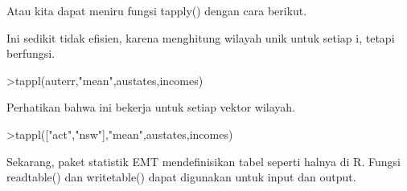 \documentclass[a4paper,10pt]{article}
\begin{document}
\begin{eulernotebook}
\begin{eulercomment}
\begin{eulercomment}
\begin{eulercomment}
\begin{eulercomment}
\begin{eulercomment}
\begin{eulercomment}
\begin{eulercomment}
\begin{eulercomment}
\begin{eulercomment}
\begin{eulercomment}
\begin{eulercomment}
\begin{eulercomment}
\begin{eulercomment}
\begin{eulercomment}
\begin{eulercomment}
\begin{eulercomment}
\begin{eulercomment}
\begin{eulercomment}
\begin{eulercomment}
\begin{eulercomment}
\begin{eulercomment}
\begin{eulercomment}
\begin{eulercomment}
Atau kita dapat meniru fungsi tapply() dengan cara berikut.
\end{eulercomment}
\begin{eulercomment}
Ini sedikit tidak efisien, karena menghitung wilayah unik untuk setiap
i, tetapi berfungsi.
\end{eulercomment}
\begin{eulerprompt}
>tappl(auterr,"mean",austates,incomes)
\end{eulerprompt}
\begin{euleroutput}
  [44.5,  57.3333333333,  55.5,  53.6,  55,  60.5,  56,  52.25]
\end{euleroutput}
\begin{eulercomment}
Perhatikan bahwa ini bekerja untuk setiap vektor wilayah.
\end{eulercomment}
\begin{eulerprompt}
>tappl(["act","nsw"],"mean",austates,incomes)
\end{eulerprompt}
\begin{euleroutput}
  [44.5,  57.3333333333]
\end{euleroutput}
\begin{eulercomment}
Sekarang, paket statistik EMT mendefinisikan tabel seperti halnya di
R. Fungsi readtable() dan writetable() dapat digunakan untuk input dan
output.


\end{eulercomment}
\end{eulercomment}
\end{eulercomment}
\end{eulercomment}
\end{eulercomment}
\end{eulercomment}
\end{eulercomment}
\end{eulercomment}
\end{eulercomment}
\end{eulercomment}
\end{eulercomment}
\end{eulercomment}
\end{eulercomment}
\end{eulercomment}
\end{eulercomment}
\end{eulercomment}
\end{eulercomment}
\end{eulercomment}
\end{eulercomment}
\end{eulercomment}
\end{eulercomment}
\end{eulercomment}
\end{eulercomment}
\end{eulernotebook}
\end{document}
